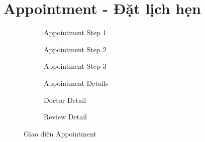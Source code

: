 \section{Appointment - Đặt lịch hẹn}
\begin{figure}[H]
    \centering
    
    \begin{subfigure}[b]{0.24\textwidth}
        \centering
        \caption{Appointment Step 1}
    \end{subfigure}
    \hfill
    \begin{subfigure}[b]{0.24\textwidth}
        \centering
        \caption{Appointment Step 2}
    \end{subfigure}
    \hfill
    \begin{subfigure}[b]{0.24\textwidth}
        \centering
        \caption{Appointment Step 3}
    \end{subfigure}
    \hfill
    \begin{subfigure}[b]{0.24\textwidth}
        \centering
        \caption{Appointment Details}
    \end{subfigure}
    
    \vspace{1em}
    
    \begin{subfigure}[b]{0.24\textwidth}
        \centering
        \caption{Doctor Detail}
    \end{subfigure}
    \hfill
    \begin{subfigure}[b]{0.24\textwidth}
        \centering
        \caption{Review Detail}
    \end{subfigure}
    \hfill
    \begin{subfigure}[b]{0.24\textwidth}
    \end{subfigure}
    \hfill
    \begin{subfigure}[b]{0.24\textwidth}
    \end{subfigure}
    
    \vspace{1em}
    \caption{Giao diện Appointment}
\end{figure}

